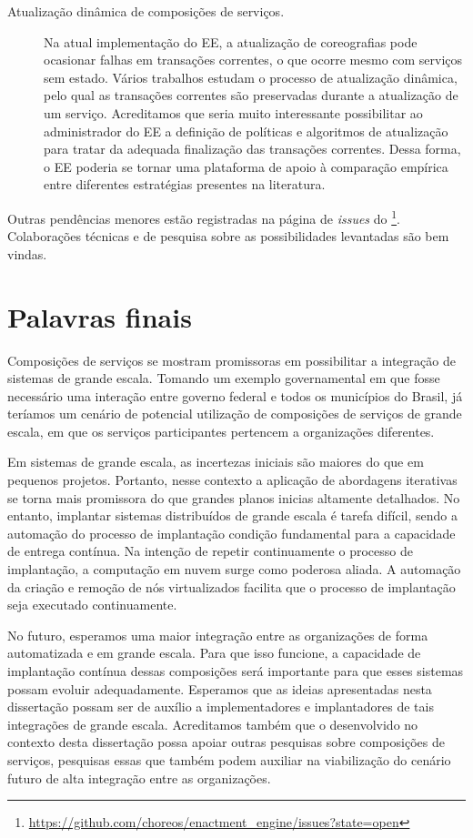 \begin{description}
\item[Atualização dinâmica de composições de serviços.] Na atual implementação do EE,
a atualização de coreografias pode ocasionar falhas em transações correntes,
o que ocorre mesmo com serviços sem estado.
Vários trabalhos \cite{Kramer1990Philosophers, Vandewoude2007Tranquility, Xiaoxing2011VersionConsistent} 
estudam o processo de atualização dinâmica, pelo qual as transações correntes 
são preservadas durante a atualização de um serviço. 
Acreditamos que seria muito interessante possibilitar ao administrador do EE
a definição de políticas e algoritmos de atualização para 
tratar da adequada finalização das transações correntes.
Dessa forma, o EE poderia se tornar uma plataforma de apoio
à comparação empírica entre diferentes estratégias presentes na literatura.

\end{description}

Outras pendências menores estão registradas na página de \emph{issues} 
do \ee\footnote{\url{https://github.com/choreos/enactment_engine/issues?state=open}}.
Colaborações técnicas e de pesquisa sobre as possibilidades levantadas
são bem vindas.


\section{Palavras finais}

Composições de serviços se mostram promissoras
em possibilitar a integração de sistemas de grande escala.
Tomando um exemplo governamental em que fosse necessário
uma interação entre governo federal e todos os municípios do Brasil,
já teríamos um cenário de potencial utilização de composições
de serviços de grande escala, em que os serviços participantes
pertencem a organizações diferentes.

Em sistemas de grande escala, as incertezas iniciais são maiores do que
em pequenos projetos. Portanto, nesse contexto a aplicação de abordagens iterativas se torna
mais promissora do que grandes planos inicias altamente detalhados. 
No entanto, implantar sistemas distribuídos de grande escala é tarefa difícil,
sendo a automação do processo de implantação condição fundamental
para a capacidade de entrega contínua.
Na intenção de repetir continuamente o processo de implantação,
a computação em nuvem surge como poderosa aliada.
A automação da criação e remoção de nós virtualizados facilita que o
processo de implantação seja executado continuamente. 

No futuro, esperamos uma maior integração entre as organizações 
de forma automatizada e em grande escala.
Para que isso funcione, a capacidade de implantação contínua
dessas composições será importante para que esses sistemas
possam evoluir adequadamente.
Esperamos que as ideias apresentadas nesta dissertação
possam ser de auxílio a implementadores e implantadores
de tais integrações de grande escala.
Acreditamos também que o \ee desenvolvido no contexto desta dissertação
possa apoiar outras pesquisas sobre composições de serviços, 
pesquisas essas que também podem auxiliar
na viabilização do cenário futuro de alta integração entre as organizações. 


